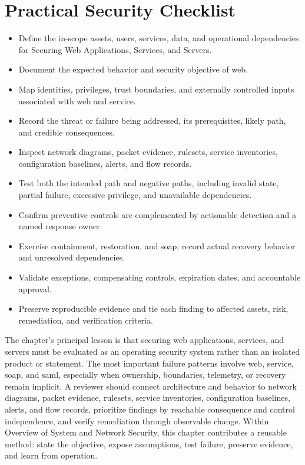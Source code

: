 \documentclass[11pt]{article}
\begin{document}
\section*{Practical Security Checklist}
\begin{itemize}[label=$\square$]
\item Define the in-scope assets, users, services, data, and operational dependencies for Securing Web Applications, Services, and Servers.
\item Document the expected behavior and security objective of web.
\item Map identities, privileges, trust boundaries, and externally controlled inputs associated with web and service.
\item Record the threat or failure being addressed, its prerequisites, likely path, and credible consequences.
\item Inspect network diagrams, packet evidence, rulesets, service inventories, configuration baselines, alerts, and flow records.
\item Test both the intended path and negative paths, including invalid state, partial failure, excessive privilege, and unavailable dependencies.
\item Confirm preventive controls are complemented by actionable detection and a named response owner.
\item Exercise containment, restoration, and soap; record actual recovery behavior and unresolved dependencies.
\item Validate exceptions, compensating controls, expiration dates, and accountable approval.
\item Preserve reproducible evidence and tie each finding to affected assets, risk, remediation, and verification criteria.
\end{itemize}
\begin{synthesisbox}
The chapter's principal lesson is that securing web applications, services, and servers must be evaluated as an operating security system rather than an isolated product or statement. The most important failure patterns involve web, service, soap, and saml, especially when ownership, boundaries, telemetry, or recovery remain implicit. A reviewer should connect architecture and behavior to network diagrams, packet evidence, rulesets, service inventories, configuration baselines, alerts, and flow records, prioritize findings by reachable consequence and control independence, and verify remediation through observable change. Within Overview of System and Network Security, this chapter contributes a reusable method: state the objective, expose assumptions, test failure, preserve evidence, and learn from operation.
\end{synthesisbox}
\end{document}
